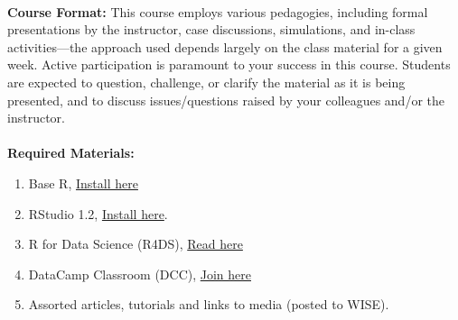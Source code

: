 \documentclass[11pt]{article}
\begin{document}
\textbf {\large \\ Course Format:} This course employs various pedagogies, including formal presentations by the instructor, case discussions, simulations, and in-class activities---the approach used depends largely on the class material for a given week. Active participation is paramount to your success in this course. Students are expected to question, challenge, or clarify the material as it is being presented, and to discuss issues/questions raised by your colleagues and/or the instructor.  \\\\


\textbf {\large Required Materials:}
\begin{enumerate} 
\itemsep-0.4em
  \item Base R, \href{https://cran.r-project.org/}{Install here}
  \item RStudio 1.2, \href{https://www.rstudio.com/products/rstudio/download}{Install here}. 
  \item R for Data Science (R4DS), \href{https://r4ds.had.co.nz}{Read here}
  \item DataCamp Classroom (DCC), \href{https://www.datacamp.com/groups/shared_links/526ee016c61b2912b2bbc7a2f7fd1f1cf1ea3d09}{Join here}
  \item Assorted articles, tutorials and links to media (posted to WISE).
  \end{enumerate}

\newpage

\end{document}
